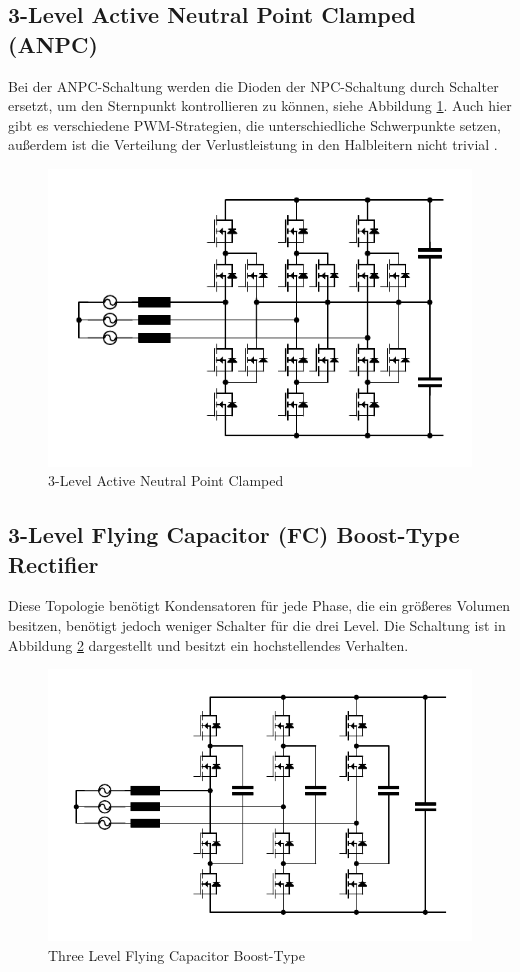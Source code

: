 	\subsection{3-Level Active Neutral Point Clamped (ANPC)}
		Bei der \gls{ANPC}-Schaltung werden die Dioden der \gls{NPC}-Schaltung durch Schalter ersetzt, um den Sternpunkt kontrollieren zu können, siehe Abbildung \ref{fig:anpc}. Auch hier gibt es verschiedene \gls{PWM}-Strategien, die unterschiedliche Schwerpunkte setzen, außerdem ist die Verteilung der Verlustleistung in den Halbleitern nicht trivial \cite{ANPC}.
	
		\begin{figure}
			\centering
			\includegraphics[width=0.9\linewidth]{content/Grafiken/ANPC}
			\caption{3-Level Active Neutral Point Clamped}
			\label{fig:anpc}
		\end{figure}
	
	
	\subsection{3-Level Flying Capacitor (FC) Boost-Type Rectifier}
		Diese Topologie benötigt Kondensatoren für jede Phase, die ein größeres Volumen besitzen, benötigt jedoch weniger Schalter für die drei Level. Die Schaltung ist in Abbildung \ref{fig:3l-fc-boost} dargestellt und besitzt ein hochstellendes Verhalten.
		\begin{figure}
			\centering
			\includegraphics[width=1\linewidth]{content/Grafiken/3L-FC-Boost}
			\caption{Three Level Flying Capacitor Boost-Type}
			\label{fig:3l-fc-boost}
		\end{figure}
	
